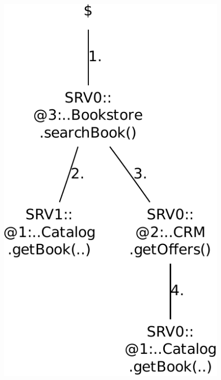 \begin{figure}[h]
{\ \ \includegraphics[scale=0.4]{images/example-plots/callTree-6488138950668976130-crop}\ \ 
}
\end{figure}
